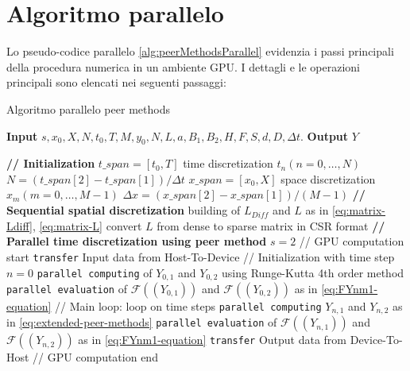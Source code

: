 \section{Algoritmo parallelo} \label{subsec:approccio-parallelo-algoritmo-parallelo}
\noindent Lo pseudo-codice parallelo \ref{alg:peerMethodsParallel} evidenzia i passi principali della procedura numerica in un ambiente GPU. I dettagli e le operazioni principali sono elencati nei seguenti passaggi:

\newpage

\begin{breakablealgorithm}
    \caption{Algoritmo parallelo peer methods}\label{alg:peerMethodsParallel}
    \vspace{0.5cm}
    \textbf{Input} $s,x_0,X,N, t_0, T,M, y_0,N, L, a,B_1,B_2,H, F, S, d, D, \Delta t$. \quad
    \textbf{Output} $Y$
    \vspace{0.2cm}
    \begin{algorithmic}[1]
        \Statex \textbf{// Initialization}
        \State $t\_span = [t_0, T]$
        \State time discretization $t_n(n = 0, \ldots, N)$
        \State $N = (t\_span[2]-t\_span[1])/\Delta t$
        \State $x\_span = [x_0, X]$
        \State space discretization $x_m(m = 0, \ldots, M - 1)$
        \State $\Delta x = (x\_span[2]-x\_span[1])/(M - 1)$
        \Statex \textbf{// Sequential spatial discretization}
        \State building of $L_{Diff}$ and $L$ as in \eqref{eq:matrix-Ldiff}, \eqref{eq:matrix-L}
        \State convert $L$ from dense to sparse matrix in CSR format
        \Statex \textbf{// Parallel time discretization using peer method}
        \State $s = 2$
        \Statex // GPU computation start
        \State \texttt{transfer} Input data from Host-To-Device
        \Statex // Initialization with time step $n = 0$
        \State \texttt{parallel computing} of $Y_{0,1}$ and $Y_{0,2}$ using Runge-Kutta 4th order method
        \State \texttt{parallel evaluation} of $\mathcal{F}((Y_{0,1}))$ and $\mathcal{F}((Y_{0,2}))$ as in \eqref{eq:FYnm1-equation}
        \Statex // Main loop: loop on time steps
        \State \texttt{parallel computing} $Y_{n,1}$ and $Y_{n,2}$ as in \eqref{eq:extended-peer-methods}
        \State \texttt{parallel evaluation} of $\mathcal{F}((Y_{n,1}))$ and $\mathcal{F}((Y_{n,2}))$ as in \eqref{eq:FYnm1-equation}
        \EndFor
        \State \texttt{transfer} Output data from Device-To-Host
        \Statex // GPU computation end
    \end{algorithmic}
\end{breakablealgorithm}
